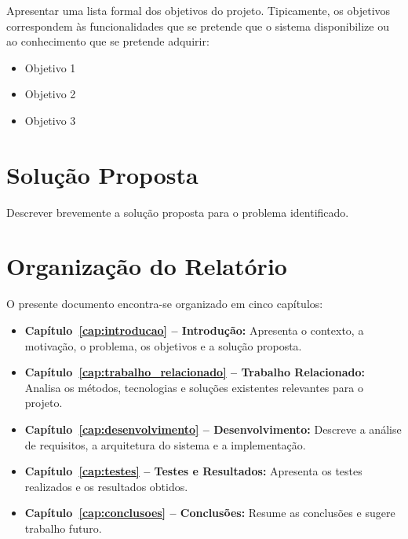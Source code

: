 Apresentar uma lista formal dos objetivos do projeto. Tipicamente, os objetivos correspondem às funcionalidades que se pretende que o sistema disponibilize ou ao conhecimento que se pretende adquirir:

\begin{itemize}
    \item Objetivo 1
    \item Objetivo 2
    \item Objetivo 3
\end{itemize}

\section{Solução Proposta}
\label{sec:solucao}

Descrever brevemente a solução proposta para o problema identificado.

\section{Organização do Relatório}
\label{sec:organizacao}

O presente documento encontra-se organizado em cinco capítulos:

\begin{itemize}
    \item \textbf{Capítulo~\ref{cap:introducao} -- Introdução:} Apresenta o contexto, a motivação, o problema, os objetivos e a solução proposta.
    \item \textbf{Capítulo~\ref{cap:trabalho_relacionado} -- Trabalho Relacionado:} Analisa os métodos, tecnologias e soluções existentes relevantes para o projeto.
    \item \textbf{Capítulo~\ref{cap:desenvolvimento} -- Desenvolvimento:} Descreve a análise de requisitos, a arquitetura do sistema e a implementação.
    \item \textbf{Capítulo~\ref{cap:testes} -- Testes e Resultados:} Apresenta os testes realizados e os resultados obtidos.
    \item \textbf{Capítulo~\ref{cap:conclusoes} -- Conclusões:} Resume as conclusões e sugere trabalho futuro.
\end{itemize}
